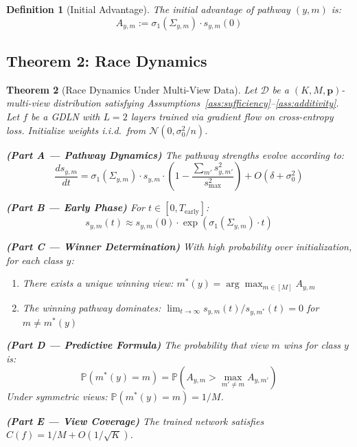\documentclass{article}
\newtheorem{theorem}{Theorem}
\newtheorem{definition}[theorem]{Definition}
\newcommand{\Prob}{\mathbb{P}}
\newcommand{\cD}{\mathcal{D}}
\begin{document}
\begin{definition}[Initial Advantage]
The initial advantage of pathway $(y,m)$ is:
\begin{equation}
    A_{y,m} := \sigma_1(\Sigma_{y,m}) \cdot s_{y,m}(0)
\end{equation}
\end{definition}

\subsection{Theorem 2: Race Dynamics}

\begin{theorem}[Race Dynamics Under Multi-View Data]
\label{thm:race}
Let $\cD$ be a $(K, M, \mathbf{p})$-multi-view distribution satisfying Assumptions~\ref{ass:sufficiency}--\ref{ass:additivity}. Let $f$ be a GDLN with $L=2$ layers trained via gradient flow on cross-entropy loss. Initialize weights i.i.d.\ from $\mathcal{N}(0, \sigma_0^2/n)$.

\textbf{(Part A --- Pathway Dynamics)} The pathway strengths evolve according to:
\begin{equation}
    \frac{ds_{y,m}}{dt} = \sigma_1(\Sigma_{y,m}) \cdot s_{y,m} \cdot \left(1 - \frac{\sum_{m'} s_{y,m'}^2}{s_{\max}^2}\right) + O(\delta + \sigma_0^2)
\end{equation}

\textbf{(Part B --- Early Phase)} For $t \in [0, T_{\text{early}}]$:
\begin{equation}
    s_{y,m}(t) \approx s_{y,m}(0) \cdot \exp\left(\sigma_1(\Sigma_{y,m}) \cdot t\right)
\end{equation}

\textbf{(Part C --- Winner Determination)} With high probability over initialization, for each class $y$:
\begin{enumerate}
    \item There exists a unique winning view: $m^*(y) = \arg\max_{m \in [M]} A_{y,m}$
    \item The winning pathway dominates: $\lim_{t \to \infty} s_{y,m}(t) / s_{y,m^*}(t) = 0$ for $m \neq m^*(y)$
\end{enumerate}

\textbf{(Part D --- Predictive Formula)} The probability that view $m$ wins for class $y$ is:
\begin{equation}
    \Prob(m^*(y) = m) = \Prob\left( A_{y,m} > \max_{m' \neq m} A_{y,m'} \right)
\end{equation}
Under symmetric views: $\Prob(m^*(y) = m) = 1/M$.

\textbf{(Part E --- View Coverage)} The trained network satisfies $C(f) = 1/M + O(1/\sqrt{K})$.
\end{theorem}
\end{document}
